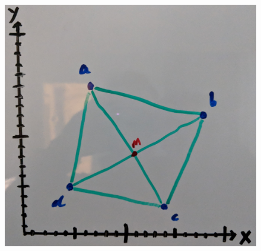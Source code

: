 \documentclass[12pt]{article}
\begin{document}
\begin{enumerate}
{		\begin{figure}[h!]
		\begin{center}
		\includegraphics[scale=.1]{TSP_Quad.jpg}
		\end{center}
		\vspace{-4mm}
		\end{figure}\newpage

}
\end{enumerate}
\end{document}
